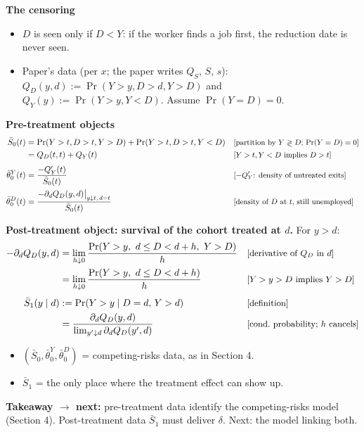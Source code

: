 \documentclass[11pt]{article}
\newcommand{\1}{\mathbf{1}}
\newcommand{\why}[1]{\text{\small[#1]}}
\newcommand{\takeaway}[1]{\par\noindent\textbf{Takeaway $\rightarrow$ next:} #1\par}
\begin{document}
\textbf{The censoring}
\begin{itemize}
  \item $D$ is seen only if $D<Y$: if the worker finds a job first, the reduction date is never seen.
  \item Paper's data (per $x$; the paper writes $Q_S$, $S$, $s$): $Q_D(y,d):=\Pr(Y>y,D>d,Y>D)$ and $Q_Y(y):=\Pr(Y>y,Y<D)$. Assume $\Pr(Y=D)=0$.
\end{itemize}

\textbf{Pre-treatment objects}
\begin{align}
  \bar S_0(t) &= \Pr(Y>t,D>t,Y>D)+\Pr(Y>t,D>t,Y<D) && \why{partition by $Y\gtrless D$; $\Pr(Y=D)=0$} \nonumber\\
  &= Q_D(t,t)+Q_Y(t) && \why{$Y>t,Y<D$ implies $D>t$} \nonumber\\[3pt]
  \bar\theta^Y_0(t) &= \frac{-Q_Y'(t)}{\bar S_0(t)} && \why{$-Q_Y'$: density of untreated exits} \nonumber\\
  \bar\theta^D_0(t) &= \frac{-\partial_dQ_D(y,d)\big|_{y\downarrow t,\,d=t}}{\bar S_0(t)} && \why{density of $D$ at $t$, still unemployed} \nonumber
\end{align}

\textbf{Post-treatment object: survival of the cohort treated at $d$.} For $y>d$:
\begin{align}
  -\partial_dQ_D(y,d) &= \lim_{h\downarrow0}\frac{\Pr(Y>y,\ d\le D<d+h,\ Y>D)}{h} && \why{derivative of $Q_D$ in $d$} \nonumber\\
  &= \lim_{h\downarrow0}\frac{\Pr(Y>y,\ d\le D<d+h)}{h} && \why{$Y>y>D$ implies $Y>D$} \nonumber\\[3pt]
  \bar S_1(y\mid d) &:= \Pr(Y>y\mid D=d,\,Y>d) && \why{definition} \nonumber\\
  &= \frac{\partial_dQ_D(y,d)}{\lim_{y'\downarrow d}\partial_dQ_D(y',d)} && \why{cond.\ probability; $h$ cancels} \label{eq:P1data}
\end{align}
\begin{itemize}
  \item $(\bar S_0,\bar\theta^Y_0,\bar\theta^D_0)$ = competing-risks data, as in Section 4.
  \item $\bar S_1$ = the only place where the treatment effect can show up.
\end{itemize}
\takeaway{pre-treatment data identify the competing-risks model (Section 4). Post-treatment data $\bar S_1$ must deliver $\delta$. Next: the model linking both.}

\end{document}
